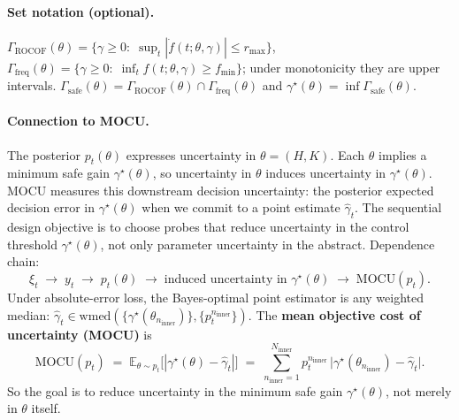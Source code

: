 \documentclass[10pt]{article}
\newcommand{\MOCU}{\mathrm{MOCU}}
\newcommand{\Gammasafe}{\Gamma_{\mathrm{safe}}}
\newcommand{\GammaROCOF}{\Gamma_{\mathrm{ROCOF}}}
\newcommand{\Gammafreq}{\Gamma_{\mathrm{freq}}}
\newcommand{\wmed}{\mathrm{wmed}}
\newcommand{\Ninner}{N_{\mathrm{inner}}}
\newcommand{\ninner}{n_{\mathrm{inner}}}
\begin{document}
\paragraph{Set notation (optional).}
$\GammaROCOF(\theta)=\{\gamma\ge 0:\;\sup_t|\dot f(t;\theta,\gamma)|\le r_{\max}\}$, $\Gammafreq(\theta)=\{\gamma\ge 0:\;\inf_t f(t;\theta,\gamma)\ge f_{\min}\}$; under monotonicity they are upper intervals. $\Gammasafe(\theta)=\GammaROCOF(\theta)\cap\Gammafreq(\theta)$ and $\gamma^\star(\theta)=\inf\Gammasafe(\theta)$.

\paragraph{Connection to MOCU.}
The posterior $p_t(\theta)$ expresses uncertainty in $\theta=(H,K)$. Each $\theta$ implies a minimum safe gain $\gamma^\star(\theta)$, so uncertainty in $\theta$ induces uncertainty in $\gamma^\star(\theta)$. MOCU measures this downstream decision uncertainty: the posterior expected decision error in $\gamma^\star(\theta)$ when we commit to a point estimate $\hat\gamma_t$. The sequential design objective is to choose probes that reduce uncertainty in the control threshold $\gamma^\star(\theta)$, not only parameter uncertainty in the abstract. Dependence chain:
\[
\xi_t\;\longrightarrow\;y_t\;\longrightarrow\;p_t(\theta)\;\longrightarrow\;\text{induced uncertainty in }\gamma^\star(\theta)\;\longrightarrow\;\MOCU(p_t).
\]
Under absolute-error loss, the Bayes-optimal point estimator is any weighted median: $\hat\gamma_t\in\wmed(\{\gamma^\star(\theta_{\ninner})\},\{p_t^{\ninner}\})$. The \textbf{mean objective cost of uncertainty (MOCU)} is
\begin{equation}
\label{eq:mocu_gamma}
\MOCU(p_t)\;=\;\mathbb{E}_{\theta\sim p_t}\big[|\gamma^\star(\theta)-\hat\gamma_t|\big]\;=\;\sum_{\ninner=1}^{\Ninner}p_t^{\ninner}\,\big|\gamma^\star(\theta_{\ninner})-\hat\gamma_t\big|.
\end{equation}
So the goal is to reduce uncertainty in the minimum safe gain $\gamma^\star(\theta)$, not merely in $\theta$ itself.
\end{document}

